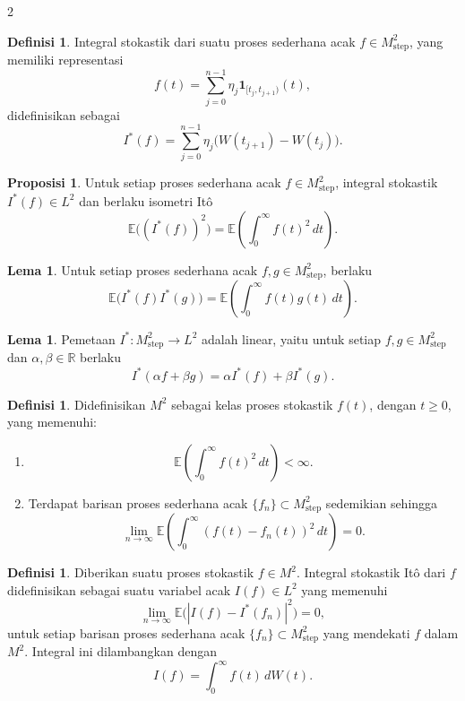 \documentclass[a4paper,extrafontsizes, 9pt]{memoir}
\theoremstyle{definition}
\newtheorem{definisi}[kalstok]{Definisi}
\newtheorem{lemma}[kalstok]{Lema}
\newtheorem{proposisi}[kalstok]{Proposisi}
\theoremstyle{plain}
\theoremstyle{remark}
\begin{document}
\begin{multicols}{2}
  \begin{definisi}
    Integral stokastik dari suatu proses sederhana acak $f\in M_{\text{step}}^2$, yang memiliki
    representasi
    \[f(t)=\sum_{j=0}^{n-1}\eta_j\mathbf{1}_{[t_j,t_{j+1})}(t),\]
    didefinisikan sebagai
    \[I^*(f)=\sum_{j=0}^{n-1}\eta_j\bigl(W(t_{j+1})-W(t_j)\bigr).\]
  \end{definisi}

  \begin{proposisi}
    Untuk setiap proses sederhana acak $f\in M_{\text{step}}^2$, integral stokastik
    $I^*(f)\in L^2$ dan berlaku isometri It\^o
    \[\mathbb{E}\bigl((I^*(f))^2\bigr)=\mathbb{E}\left(\int_0^\infty f(t)^2\,dt\right).\]
  \end{proposisi}

  \begin{lemma}
    Untuk setiap proses sederhana acak $f,g\in M_{\text{step}}^2$, berlaku
    \[\mathbb{E}\bigl(I^*(f)I^*(g)\bigr)=\mathbb{E}\left(\int_0^\infty f(t)g(t)\,dt\right).\]
  \end{lemma}

  \begin{lemma}
    Pemetaan $I^*:M_{\text{step}}^2\to L^2$ adalah linear, yaitu untuk setiap
    $f,g\in M_{\text{step}}^2$ dan $\alpha,\beta\in\mathbb{R}$ berlaku
    \[I^*(\alpha f+\beta g)=\alpha I^*(f)+\beta I^*(g).\]
  \end{lemma}

  \begin{definisi}
    Didefinisikan $M^2$ sebagai kelas proses stokastik $f(t)$, dengan $t\ge 0$, yang memenuhi:
    \begin{enumerate}[leftmargin=*, itemsep=0.5mm]
      \item
            \[\mathbb{E}\left(\int_0^\infty f(t)^2\,dt\right)<\infty.\]
      \item Terdapat barisan proses sederhana acak $\{f_n\}\subset M_{\text{step}}^2$
            sedemikian sehingga
            \[\lim_{n\to\infty}\mathbb{E}\left(\int_0^\infty (f(t)-f_n(t))^2\,dt\right)=0.\]
    \end{enumerate}
  \end{definisi}

  \begin{definisi}
    Diberikan suatu proses stokastik $f\in M^2$. Integral stokastik It\^o dari $f$ didefinisikan
    sebagai suatu variabel acak $I(f)\in L^2$ yang memenuhi
    \[\lim_{n\to\infty}\mathbb{E}\bigl(|I(f)-I^*(f_n)|^2\bigr)=0,\]
    untuk setiap barisan proses sederhana acak $\{f_n\}\subset M_{\text{step}}^2$ yang
    mendekati $f$ dalam $M^2$. Integral ini dilambangkan dengan
    \[I(f)=\int_0^\infty f(t)\,dW(t).\]
  \end{definisi}


\end{multicols}
\end{document}
